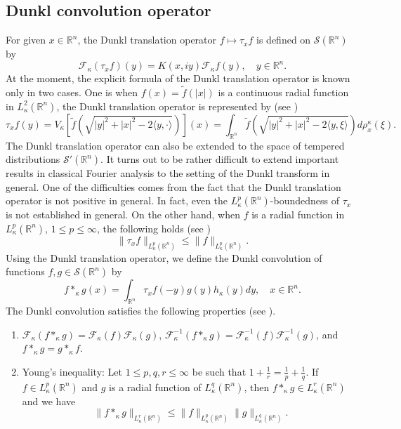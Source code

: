 \documentclass[a4paper,11pt, reqno]{amsart}
\numberwithin{equation}{section}
\theoremstyle{plain}
\theoremstyle{definition}
\theoremstyle{remark}
\begin{document}
\subsection{Dunkl convolution operator} For  given $x\in\mathbb{R}^n$, the Dunkl translation operator $f\mapsto \tau_x f$ is defined on $\mathcal{S}\left(\mathbb{R}^{n}\right)$ by
\begin{equation*}
\mathcal{F}_\kappa(\tau_x f)(y)=K(x,iy)\mathcal{F}_\kappa f(y),\quad y\in\mathbb{R}^n.
\end{equation*}
At the moment, the explicit formula of the Dunkl translation operator is known only in two cases. One is when $f(x)=\tilde{f}(|x|)$ is a continuous radial function in $L_\kappa^2(\mathbb{R}^n)$, the Dunkl translation operator is represented by (see \cite{ros, Dai-Wang})
\begin{equation} \label{translator}
\tau_xf(y)=V_\kappa[\tilde{f}\left(\sqrt{|y|^2+|x|^2-2\langle y,\cdot\rangle}\right)](x)=\int_{\mathbb{R}^n}\tilde{f}\left(\sqrt{|y|^2+|x|^2-2\langle y,\xi\rangle}\right)d\rho^\kappa_x(\xi).
\end{equation}
The Dunkl translation operator can also be extended to the space of tempered distributions $\mathcal{S}'\left(\mathbb{R}^{n}\right)$. It turns out to be rather difficult to extend important results in classical Fourier analysis to the setting of the Dunkl transform in general. One of the difficulties comes from the fact that the Dunkl translation operator is not positive in
general. In fact, even the $L_\kappa^p(\mathbb{R}^n)$-boundedness of $\tau_x$ is not established in general. On the other hand, when $f$ is a radial function in $L_\kappa^p(\mathbb{R}^n)$, $1\leq p\leq \infty$, the following holds (see \cite{GIT2019, Thangavelu-Xu2005})
\begin{equation*}
\|\tau_xf\|_{L_\kappa^p(\mathbb{R}^n)}\leq \|f\|_{L_\kappa^p(\mathbb{R}^n)}.
\end{equation*}
Using the Dunkl translation operator, we define the Dunkl convolution  of functions $f,g\in \mathcal{S}\left(\mathbb{R}^{n}\right)$ by
\begin{equation*}
f*_\kappa g(x)=\int_{\mathbb{R}^n}\tau_xf(-y)g(y)h_\kappa(y)dy, \quad x\in\mathbb{R}^n.
\end{equation*}
The Dunkl convolution satisfies the following properties (see \cite{Thangavelu-Xu2005}).
\begin{enumerate}
    \item  $\mathcal{F}_\kappa(f*_\kappa g)=\mathcal{F}_\kappa (f)\mathcal{F}_\kappa (g)$, $\mathcal{F}^{-1}_\kappa(f*_\kappa g)=\mathcal{F}^{-1}_\kappa (f)\mathcal{F}^{-1}_\kappa (g)$, and $f*_\kappa g=g*_\kappa f$.
\item Young's inequality: Let $1\leq p,q,r\leq\infty$ be such that $1+\frac{1}{r}=\frac{1}{p}+\frac{1}{q}$. If $f\in L^p_\kappa(\mathbb{R}^n)$ and $g$ is a radial function of $L_\kappa^q(\mathbb{R}^n)$, then $f*_\kappa g\in L_\kappa^r(\mathbb{R}^n)$ and we have
\begin{equation}\label{Young}
\|f*_\kappa g\|_{L_\kappa^r(\mathbb{R}^n)}\leq \|f\|_{L_\kappa^p(\mathbb{R}^n)} \|g\|_{L_\kappa^q(\mathbb{R}^n)}.
\end{equation}
\end{enumerate}
\end{document}
